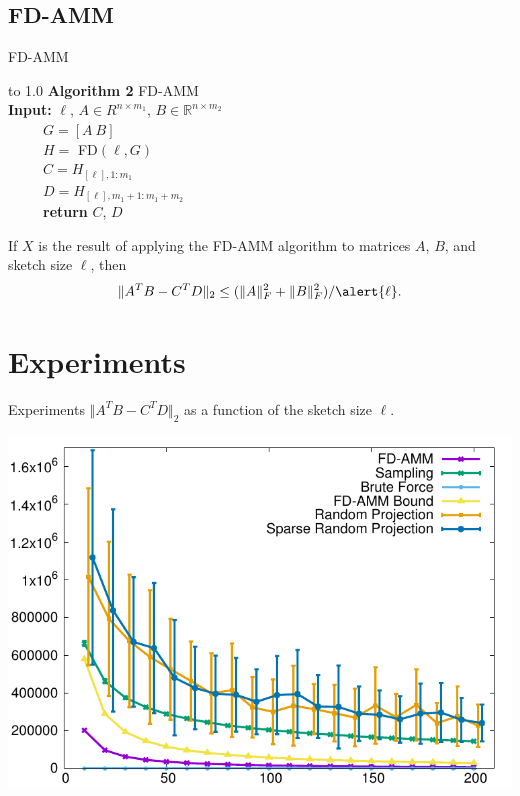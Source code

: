 \documentclass{beamer}
\def\BR{{\mathbb R}}
\begin{document}
\subsection{FD-AMM}
\begin{frame}{FD-AMM}
	
	\vspace{0.3cm}
	\renewcommand{\arraystretch}{1.1}
	\begin{tabu} to 1.0\textwidth {  X[ll]   }
		\tabucline[1pt]{-}
		\textbf{Algorithm 2} FD-AMM \\
		\tabucline[1pt]{-} 
		\textbf{Input:} $\ell$, $A \in R^{n\times m_1}$, $B\in \BR^{n\times m_2}$ \\ 
		~~~~~\alert{$G = [A\ B]$} \\
		~~~~~\alert{$H =$ FD$(\ell, G)$}\\
		~~~~~$C = H_{[\ell],1:m_1}$ \\ 
		~~~~~$D =H_{[\ell],m_1+1:m_1+m_2}$  \\
		~~~~~\textbf{return} $C$, $D$ \\
		\tabucline[1pt]{-}
	\end{tabu}
	\pause
\begin{theorem}
	  If $X$ is the result of applying the FD-AMM algorithm to matrices $A$, $B$, and sketch size $\ell$, then  
	  $$\Vert A^TB-C^TD\Vert_2 \le (\Vert A\Vert_F^2+\Vert B\Vert_F^2)/\alert{\ell}. $$  
	
\end{theorem}	
	
\end{frame}

\section{Experiments}
\begin{frame}{Experiments}
		$\Vert A^TB- C^TD \Vert_2$ as a function of the sketch size $\ell$. 
		\begin{center}
				\includegraphics*[scale=0.8]{figures/ms2.pdf} 
		\end{center}
	
\end{frame}
\end{document}

